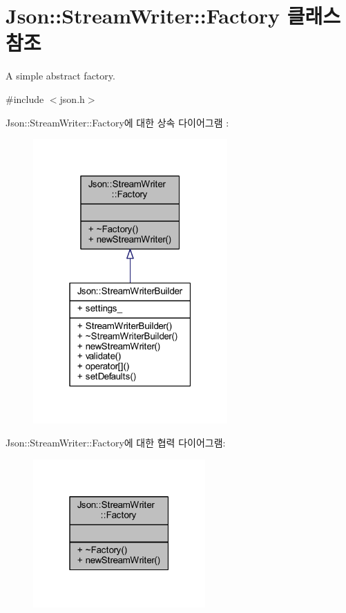 \hypertarget{class_json_1_1_stream_writer_1_1_factory}{}\section{Json\+:\+:Stream\+Writer\+:\+:Factory 클래스 참조}
\label{class_json_1_1_stream_writer_1_1_factory}


A simple abstract factory.  




{\ttfamily \#include $<$json.\+h$>$}



Json\+:\+:Stream\+Writer\+:\+:Factory에 대한 상속 다이어그램 \+: \nopagebreak
\begin{figure}[H]
\begin{center}
\leavevmode
\includegraphics[width=211pt]{class_json_1_1_stream_writer_1_1_factory__inherit__graph}
\end{center}
\end{figure}


Json\+:\+:Stream\+Writer\+:\+:Factory에 대한 협력 다이어그램\+:\nopagebreak
\begin{figure}[H]
\begin{center}
\leavevmode
\includegraphics[width=187pt]{class_json_1_1_stream_writer_1_1_factory__coll__graph}
\end{center}
\end{figure}
